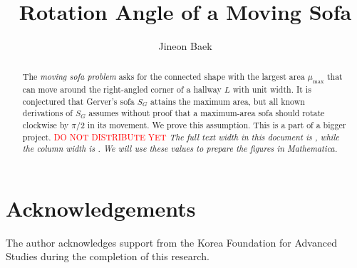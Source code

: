 \documentclass[11pt, letterpaper]{amsart}
\title{Rotation Angle of a Moving Sofa}
\author{Jineon Baek}
\theoremstyle{plain}
\theoremstyle{definition}
\theoremstyle{remark}
\begin{document}
\maketitle

\begin{abstract}
The \emph{moving sofa problem} asks for the connected shape with the largest area $\mu_{\text{max}}$
that can move around the right-angled corner of a hallway $L$ with unit width.
It is conjectured that Gerver's sofa $S_G$ attains the maximum area,
but all known derivations of $S_G$ assumes without proof that
a maximum-area sofa should rotate clockwise by $\pi/2$ in its movement.
We prove this assumption. This is a part of a bigger project.
\textcolor{red}{DO NOT DISTRIBUTE YET}
\emph{The full text width in this document is \the\textwidth, while the column width is \the\columnwidth.  We will use these values to prepare the figures in Mathematica.}
\end{abstract}



\section*{Acknowledgements}

The author acknowledges support from the Korea Foundation for Advanced Studies during the completion of this research.


\printbibliography
\end{document}
